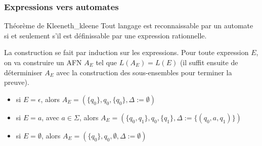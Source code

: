 \subsubsection{Expressions vers automates}
\label{subsub:expressions_vers_automates}

\begin{theorem}{Théorème de Kleene}{th_kleene}
    Tout langage est reconnaissable par un automate si et seulement s'il est définissable par une expression rationnelle.
\end{theorem}
La construction se fait par induction sur les expressions. Pour toute expression $E$, on va construire un AFN $A_E$ tel que
$L(A_E) = L(E)$ (il suffit ensuite de déterminiser $A_E$ avec la construction des sous-ensembles pour terminer la preuve).
\begin{itemize}[label=\textbullet]
    \item si $E = \epsilon$, alors $A_E = (\{q_0\}, q_0, \{q_0\}, \Delta := \emptyset)$
    \item si $E = a$, avec $a\in\Sigma$, alors $A_E = (\{q_0,q_1\}, q_0, \{q_1\}, \Delta := \{(q_0,a,q_1)\})$
    \item si $E = \emptyset$, alors $A_E = (\{q_0\}, q_0, \emptyset, \Delta := \emptyset)$
\end{itemize}


